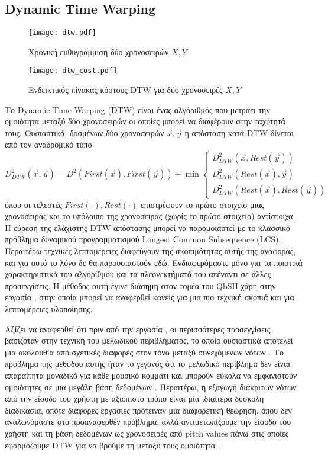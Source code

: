 \subsection{Dynamic Time Warping}\label{sub:DTW}
\begin{figure}[htb]
	\centering
	\texttt{[image: dtw.pdf]}
	\caption{Χρονική ευθυγράμμιση δύο χρονοσειρών $X, Y$}
\end{figure}
\begin{figure}
	\centering
	\texttt{[image: dtw\_cost.pdf]}
	\caption{Ενδεικτικός πίνακας κόστους DTW για δύο χρονοσειρές $X, Y$}
\end{figure}
Το Dynamic Time Warping (DTW) είναι ένας αλγόριθμός που μετράει την ομοιότητα
μεταξύ δύο χρονοσειρών οι οποίες μπορεί να διαφέρουν στην ταχύτητά τους.
Ουσιαστικά, δοσμένων δύο χρονοσειρών $\vec x, \vec y$ η απόσταση κατά DTW
δίνεται από τον αναδρομικό τύπο
$$
D^2_{DTW} \left(\vec x, \vec y\right) = D^2 \left(First \left(\vec x\right), First \left(\vec y\right)\right) + \min \begin{cases} D^2_{DTW} \left(\vec x, Rest \left(\vec y\right)\right) \\
D^2_{DTW} \left(Rest \left(\vec x\right),\vec y\right) \\
D^2_{DTW} \left(Rest \left(\vec x\right), Rest \left(\vec y\right)\right) \end{cases}
$$
όπου οι τελεστές $First \left( \cdot\right), Rest \left( \cdot\right)$
επιστρέφουν το πρώτο στοιχείο μιας χρονοσειράς και το υπόλοιπο της χρονοσειράς
(χωρίς το πρώτο στοιχείο) αντίστοιχα.
Η εύρεση της ελάχιστης DTW απόστασης μπορεί να παρομοιαστεί με το κλασσικό
πρόβλημα δυναμικού προγραμματισμού Longest Common Subsequence (LCS).
Περαιτέρω τεχνικές λεπτομέρειες διαφεύγουν της σκοπιμότητας αυτής της αναφοράς,
και για αυτό το λόγο δε θα παρουσιαστούν εδώ.
Ενδιαφερόμαστε μόνο για τα ποιοτικά χαρακτηριστικά του αλγορίθμου και τα
πλεονεκτήματά του απέναντι σε άλλες προσεγγίσεις.
Η μέθοδος αυτή έγινε διάσημη στον τομέα του QbSH χάρη στην εργασία
\cite{Zhu:2003:WIE:872757.872780}, στην  οποία μπορεί να αναφερθεί κανείς για
μια πιο τεχνική σκοπιά και για λεπτομέρειες υλοποίησης.

Αξίζει να αναφερθεί ότι πριν από την εργασία \cite{Zhu:2003:WIE:872757.872780},
οι περισσότερες προσεγγίσεις βασιζόταν στην τεχνική του μελωδικού περιβλήματος,
το οποίο ουσιαστικά αποτελεί μια ακολουθία από σχετικές διαφορές στον τόνο
μεταξύ συνεχόμενων νότων \cite{Ghias:1995:QHM:217279.215273}.
Το πρόβλημα της μεθόδου αυτής ήταν το γεγονός ότι το μελωδικό περίβλημα δεν
είναι απαραίτητα μοναδικό για κάθε μουσικό κομμάτι και μπορούν εύκολα να
εμφανιστούν ομοιότητες σε μια μεγάλη βάση δεδομένων
\cite{Uitdenbogerd:1998:MMM:290747.290776}.
Περαιτέρω, η εξαγωγή διακριτών νότων από την είσοδο του χρήστη με αξιόπιστο
τρόπο είναι μία ιδιαίτερα δύσκολη διαδικασία, οπότε διάφορες εργασίες πρότειναν
μια διαφορετική θεώρηση, όπου δεν αναλωνόμαστε στο προαναφερθέν πρόβλημα, αλλά
αντιμετωπίζουμε την είσοδο του χρήστη και τη βάση δεδομένων ως χρονοσειρές από
pitch values πάνω στις οποίες εφαρμόζουμε DTW για να βρούμε τη μεταξύ τους
ομοιότητα \cite{Jang:2001:HFM:500141.500201,mazzoni2001melody}.

